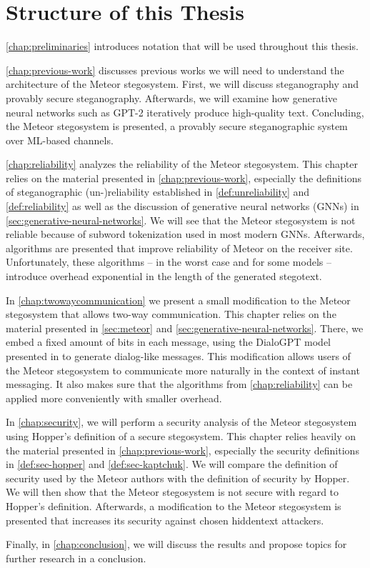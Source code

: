 \section{Structure of this Thesis}

\autoref{chap:preliminaries} introduces notation that will be used throughout this thesis.

\autoref{chap:previous-work} discusses previous works we will need to understand the architecture of the Meteor stegosystem.
First, we will discuss steganography and provably secure steganography.
Afterwards, we will examine how generative neural networks such as GPT-2 iteratively produce high-quality text.
Concluding, the Meteor stegosystem is presented, a provably secure steganographic system over ML-based channels.

\autoref{chap:reliability} analyzes the reliability of the Meteor stegosystem. 
This chapter relies on the material presented in \autoref{chap:previous-work}, especially the definitions of steganographic (un-)reliability established in \autoref{def:unreliability} and \autoref{def:reliability} as well as the discussion of generative neural networks (GNNs) in \autoref{sec:generative-neural-networks}.
We will see that the Meteor stegosystem is not reliable because of subword tokenization used in most modern GNNs.
Afterwards, algorithms are presented that improve reliability of Meteor on the receiver site.
Unfortunately, these algorithms -- in the worst case and for some models -- introduce overhead exponential in the length of the generated stegotext.

In \autoref{chap:twowaycommunication} we present a small modification to the Meteor stegosystem that allows two-way communication.
This chapter relies on the material presented in \autoref{sec:meteor} and \autoref{sec:generative-neural-networks}.
There, we embed a fixed amount of bits in each message, using the DialoGPT model presented in \cite{Zhang2020} to generate dialog-like messages.
This modification allows users of the Meteor stegosystem to communicate more naturally in the context of instant messaging.
It also makes sure that the algorithms from \autoref{chap:reliability} can be applied more conveniently with smaller overhead.

In \autoref{chap:security}, we will perform a security analysis of the Meteor stegosystem using Hopper's definition of a secure stegosystem.
This chapter relies heavily on the material presented in \autoref{chap:previous-work}, especially the security definitions in \autoref{def:sec-hopper} and \autoref{def:sec-kaptchuk}.
We will compare the definition of security used by the Meteor authors with the definition of security by Hopper.
We will then show that the Meteor stegosystem is not secure with regard to Hopper's definition.
Afterwards, a modification to the Meteor stegosystem is presented that increases its security against chosen hiddentext attackers.

Finally, in \autoref{chap:conclusion}, we will discuss the results and propose topics for further research in a conclusion.
